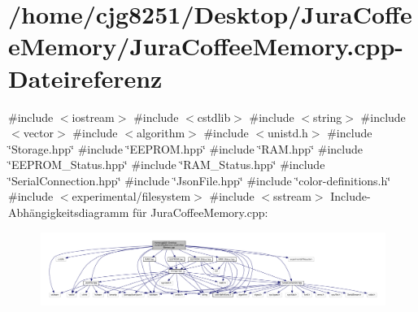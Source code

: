 \section{/home/cjg8251/\+Desktop/\+Jura\+Coffee\+Memory/\+Jura\+Coffee\+Memory.cpp-\/\+Dateireferenz}
\label{_jura_coffee_memory_8cpp}
{\ttfamily \#include $<$iostream$>$}\newline
{\ttfamily \#include $<$cstdlib$>$}\newline
{\ttfamily \#include $<$string$>$}\newline
{\ttfamily \#include $<$vector$>$}\newline
{\ttfamily \#include $<$algorithm$>$}\newline
{\ttfamily \#include $<$unistd.\+h$>$}\newline
{\ttfamily \#include \char`\"{}Storage.\+hpp\char`\"{}}\newline
{\ttfamily \#include \char`\"{}E\+E\+P\+R\+O\+M.\+hpp\char`\"{}}\newline
{\ttfamily \#include \char`\"{}R\+A\+M.\+hpp\char`\"{}}\newline
{\ttfamily \#include \char`\"{}E\+E\+P\+R\+O\+M\+\_\+\+Status.\+hpp\char`\"{}}\newline
{\ttfamily \#include \char`\"{}R\+A\+M\+\_\+\+Status.\+hpp\char`\"{}}\newline
{\ttfamily \#include \char`\"{}Serial\+Connection.\+hpp\char`\"{}}\newline
{\ttfamily \#include \char`\"{}Json\+File.\+hpp\char`\"{}}\newline
{\ttfamily \#include \char`\"{}color-\/definitions.\+h\char`\"{}}\newline
{\ttfamily \#include $<$experimental/filesystem$>$}\newline
{\ttfamily \#include $<$sstream$>$}\newline
Include-\/\+Abhängigkeitsdiagramm für Jura\+Coffee\+Memory.\+cpp\+:
\nopagebreak
\begin{figure}[H]
\begin{center}
\leavevmode
\includegraphics[width=350pt]{_jura_coffee_memory_8cpp__incl}
\end{center}
\end{figure}
